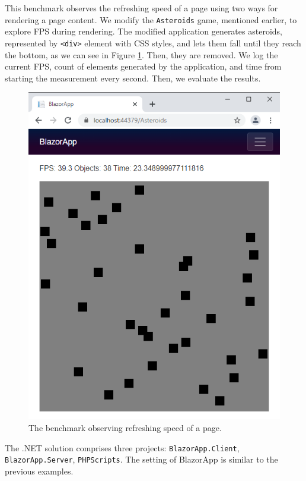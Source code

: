 This benchmark observes the refreshing speed of a page using two ways for rendering a page content.
We modify the \texttt{Asteroids} game, mentioned earlier, to explore FPS during rendering.
The modified application generates asteroids, represented by \texttt{<div>} element with CSS styles, and lets them fall until they reach the bottom, as we can see in Figure \ref{img33:benchmark}.
Then, they are removed.
We log the current FPS, count of elements generated by the application, and time from starting the measurement every second.
Then, we evaluate the results.
\par
\begin{figure}[t]\centering
\includegraphics[scale=0.7]{./img/BenchmarkRendering}
\caption{The benchmark observing refreshing speed of a page.}
\label{img33:benchmark}
\end{figure} 
\par
The .NET solution comprises three projects: \texttt{BlazorApp.Client}, \texttt{BlazorApp.Server}, \texttt{PHPScripts}.
The setting of BlazorApp is similar to the previous examples.
